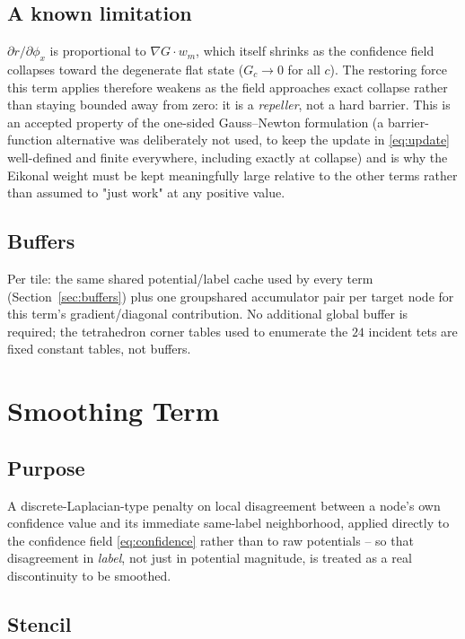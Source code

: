 \documentclass[11pt]{article}
\newcommand{\grad}{\nabla}
\begin{document}
\subsection{A known limitation}

$\partial r/\partial\phi_x$ is proportional to $\grad G\cdot w_m$, which
itself shrinks as the confidence field collapses toward the degenerate flat
state ($G_c \to 0$ for all $c$). The restoring force this term applies
therefore weakens as the field approaches exact collapse rather than
staying bounded away from zero: it is a \emph{repeller}, not a hard
barrier. This is an accepted property of the one-sided Gauss--Newton
formulation (a barrier-function alternative was deliberately not used, to
keep the update in \eqref{eq:update} well-defined and finite everywhere,
including exactly at collapse) and is why the Eikonal weight must be kept
meaningfully large relative to the other terms rather than assumed to
"just work" at any positive value.

\subsection{Buffers}

Per tile: the same shared potential/label cache used by every term
(Section~\ref{sec:buffers}) plus one groupshared accumulator pair per
target node for this term's gradient/diagonal contribution. No additional
global buffer is required; the tetrahedron corner tables used to enumerate
the $24$ incident tets are fixed constant tables, not buffers.

\section{Smoothing Term}
\label{sec:smoothing}

\subsection{Purpose}

A discrete-Laplacian-type penalty on local disagreement between a node's
own confidence value and its immediate same-label neighborhood, applied
directly to the confidence field \eqref{eq:confidence} rather than to raw
potentials -- so that disagreement in \emph{label}, not just in potential
magnitude, is treated as a real discontinuity to be smoothed.

\subsection{Stencil}
\end{document}
